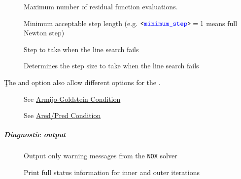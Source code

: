\begin{description}
\item[] Maximum number of residual function evaluations.
\item[] Minimum acceptable step length (e.g. $\texttt{<\textcolor{blue}{minimum\_step}>} = 1$ means full Newton step)
\item[] Step to take when the line search fails
\item[] Determines the step size to take when the line search fails
\end{description}
Ţhe  and  option also allow different options for the .
\begin{description}
\item[] See \href{https://docs.trilinos.org/latest-release/packages/nox/doc/html/classNOX_1_1LineSearch_1_1MoreThuente.html}{Armijo-Goldstein Condition}
\item[] See \href{https://docs.trilinos.org/latest-release/packages/nox/doc/html/classNOX_1_1LineSearch_1_1MoreThuente.html}{Ared/Pred Condition}
\end{description}
\subparagraph{Diagnostic output}
\begin{description}
\item[] Output only warning messages from the \verb;NOX; solver
\item[] Print full status information for inner and outer iterations
\end{description}

